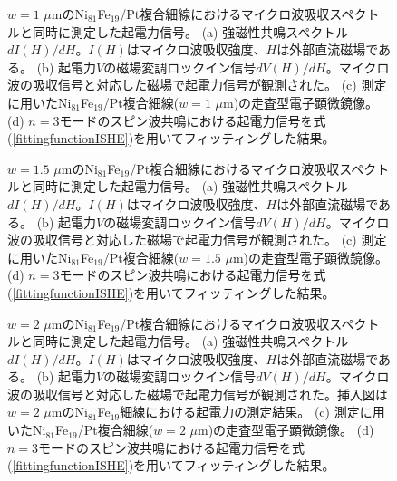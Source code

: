\begin{figure}[tbp]
 \begin{center}
 \end{center}
 \caption{$w=1$ $\mu$mのNi$_{81}$Fe$_{19}$/Pt複合細線におけるマイクロ波吸収スペクトルと同時に測定した起電力信号。
(a) 強磁性共鳴スペクトル$dI(H)/dH$。$I(H)$はマイクロ波吸収強度、$H$は外部直流磁場である。
(b) 起電力$V$の磁場変調ロックイン信号$dV(H)/dH$。マイクロ波の吸収信号と対応した磁場で起電力信号が観測された。
(c) 測定に用いたNi$_{81}$Fe$_{19}$/Pt複合細線($w=1$ $\mu$m)の走査型電子顕微鏡像。
(d) $n=3$モードのスピン波共鳴における起電力信号を式(\ref{fittingfunctionISHE})を用いてフィッティングした結果。}
 \label{spinwave_resonance_V}
\end{figure}

\begin{figure}[tbp]
 \begin{center}
 \end{center}
 \caption{$w=1.5$ $\mu$mのNi$_{81}$Fe$_{19}$/Pt複合細線におけるマイクロ波吸収スペクトルと同時に測定した起電力信号。
(a) 強磁性共鳴スペクトル$dI(H)/dH$。$I(H)$はマイクロ波吸収強度、$H$は外部直流磁場である。
(b) 起電力$V$の磁場変調ロックイン信号$dV(H)/dH$。マイクロ波の吸収信号と対応した磁場で起電力信号が観測された。
(c) 測定に用いたNi$_{81}$Fe$_{19}$/Pt複合細線($w=1.5$ $\mu$m)の走査型電子顕微鏡像。
(d) $n=3$モードのスピン波共鳴における起電力信号を式(\ref{fittingfunctionISHE})を用いてフィッティングした結果。}
 \label{spinwave_resonance_V2}
\end{figure}

\begin{figure}[tbp]
 \begin{center}
 \end{center}
 \caption{$w=2$ $\mu$mのNi$_{81}$Fe$_{19}$/Pt複合細線におけるマイクロ波吸収スペクトルと同時に測定した起電力信号。
(a) 強磁性共鳴スペクトル$dI(H)/dH$。$I(H)$はマイクロ波吸収強度、$H$は外部直流磁場である。
(b) 起電力$V$の磁場変調ロックイン信号$dV(H)/dH$。マイクロ波の吸収信号と対応した磁場で起電力信号が観測された。挿入図は$w=2$ $\mu$mのNi$_{81}$Fe$_{19}$細線における起電力の測定結果。
(c) 測定に用いたNi$_{81}$Fe$_{19}$/Pt複合細線($w=2$ $\mu$m)の走査型電子顕微鏡像。
(d) $n=3$モードのスピン波共鳴における起電力信号を式(\ref{fittingfunctionISHE})を用いてフィッティングした結果。}
 \label{spinwave_resonance_V3}
\end{figure}













